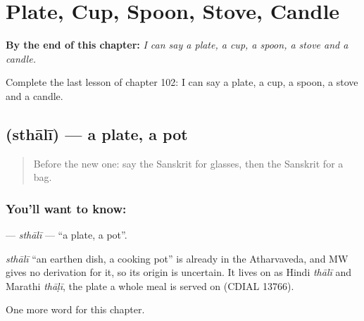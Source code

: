 
\chapter{Plate, Cup, Spoon, Stove, Candle}
\label{ch:sa-plate-cup-spoon-stove-candle}

\begin{chapteropening}
\textbf{By the end of this chapter:} \emph{I can say a plate, a cup, a spoon, a stove and a candle.}

Complete the last lesson of chapter 102: I can say a plate, a cup, a spoon, a stove and a candle.
\end{chapteropening}

\section[\texorpdfstring{\sk{स्थाली} (sthālī)}{स्थाली (sthālī)}]{ (sthālī) — a plate, a pot}

\label{lesson:SA-C102-sthali}



\begin{quote}
Before the new one: say the Sanskrit for glasses, then the Sanskrit for a bag.
\end{quote}

\subsection*{You'll want to know: }
\textbf{} — \emph{sthālī} — \textquotedblleft{}a plate, a pot\textquotedblright{}.

\begin{cousinweb}
\emph{sthālī} \textquotedblleft{}an earthen dish, a cooking pot\textquotedblright{} is already in the Atharvaveda, and MW gives no derivation for it, so its origin is uncertain. It lives on as Hindi \emph{thālī} and Marathi \emph{thāḷī}, the plate a whole meal is served on (CDIAL 13766).
\end{cousinweb}

\begin{grammarlens}[title={What you've built}]
One more word for this chapter.
\end{grammarlens}

